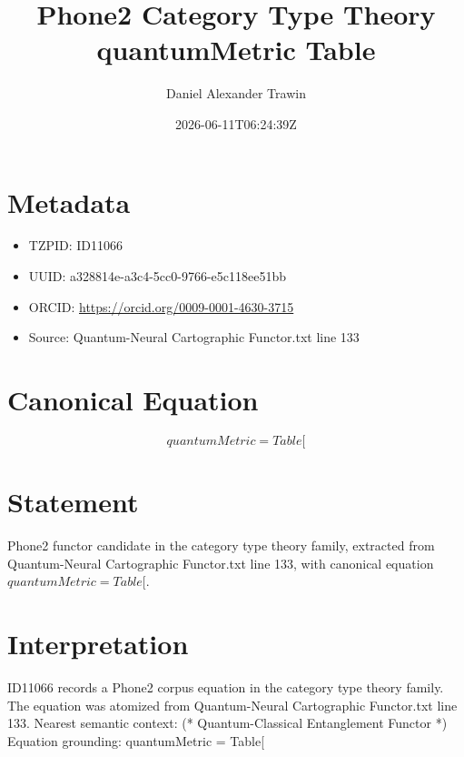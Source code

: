 \documentclass[11pt]{article}
\title{Phone2 Category Type Theory quantumMetric Table}
\author{Daniel Alexander Trawin}
\date{2026-06-11T06:24:39Z}
\begin{document}
\maketitle
\section*{Metadata}
\begin{itemize}
\item TZPID: ID11066
\item UUID: a328814e-a3c4-5cc0-9766-e5c118ee51bb
\item ORCID: \url{https://orcid.org/0009-0001-4630-3715}
\item Source: Quantum-Neural Cartographic Functor.txt line 133
\end{itemize}
\section*{Canonical Equation}
\[
quantumMetric = Table[
\]
\section*{Statement}
Phone2 functor candidate in the category type theory family, extracted from Quantum-Neural Cartographic Functor.txt line 133, with canonical equation $quantumMetric = Table[$.
\section*{Interpretation}
ID11066 records a Phone2 corpus equation in the category type theory family. The equation was atomized from Quantum-Neural Cartographic Functor.txt line 133. Nearest semantic context: (* Quantum-Classical Entanglement Functor *) Equation grounding: quantumMetric = Table[
\end{document}
